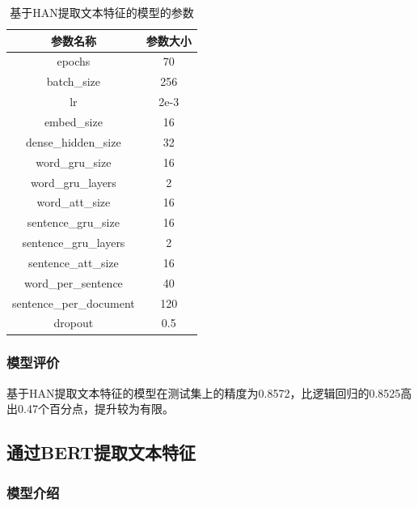 \documentclass[lang=cn,a4paper]{elegantpaper}
\begin{document}
\begin{table}[!htbp]
  \centering
  \caption{基于HAN提取文本特征的模型的参数}
  \begin{tabular}{cc}
    \toprule
    参数名称&参数大小\\
    \midrule
    epochs&70\\
    batch\_size&256\\
    lr&2e-3\\
    embed\_size&16\\
    dense\_hidden\_size&32\\

    word\_gru\_size&16\\
    word\_gru\_layers&2\\
    word\_att\_size&16\\

    sentence\_gru\_size&16\\
    sentence\_gru\_layers&2\\
    sentence\_att\_size&16\\

    word\_per\_sentence&40\\
    sentence\_per\_document&120\\

    dropout&0.5\\
    \bottomrule
  \end{tabular}
  \label{tbl:han param}
\end{table}

\subsubsection{模型评价}

基于HAN提取文本特征的模型在测试集上的精度为0.8572，比逻辑回归的0.8525高出0.47个百分点，提升较为有限。


\subsection{通过BERT提取文本特征}
\subsubsection{模型介绍}
\end{document}
